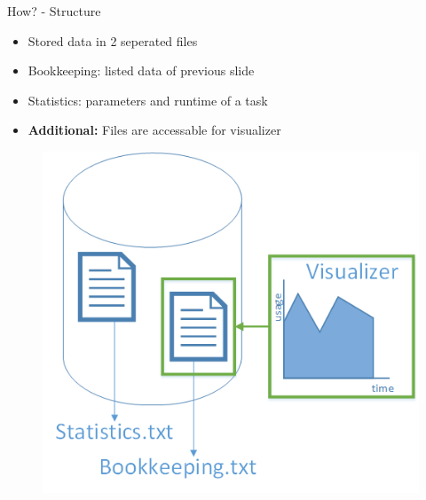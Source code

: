 	\begin{frame}{How? - Structure}
		\begin{minipage}[]{.5\textwidth}%
		\begin{itemize}
		\item<1->{} {Stored data in 2 seperated files}
		\item<2->{} {Bookkeeping: listed data of previous slide}
		\item<3->{} {Statistics: parameters and runtime of a task}
		\item<5->{} {\textbf{Additional: }Files are accessable for visualizer}
		\end{itemize}
		\end{minipage}
		\begin{minipage}[]{.45\textwidth}%
		\begin{figure}[h]
		\flushright  %
		\vspace{-\ht\strutbox}\includegraphics[width=\textwidth]{images/Task/data.png}
		\end{figure}
		\end{minipage}
	\end{frame}
